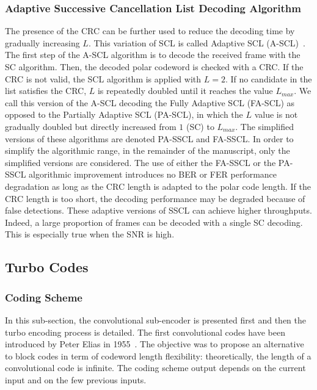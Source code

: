 \subsubsection{Adaptive Successive Cancellation List Decoding Algorithm}
\label{sec:ctx_polar_ascl}

The presence of the CRC can be further used to reduce the decoding time by
gradually increasing $L$. This variation of SCL is called Adaptive SCL
(A-SCL)~\cite{Li2012}. The first step of the A-SCL algorithm is to decode the
received frame with the SC algorithm. Then, the decoded polar codeword is
checked with a CRC. If the CRC is not valid, the SCL algorithm is applied with
$L=2$. If no candidate in the list satisfies the CRC, $L$ is repeatedly doubled
until it reaches the value $L_{max}$. We call this version of the A-SCL decoding
the Fully Adaptive SCL (FA-SCL) as opposed to the Partially Adaptive SCL
(PA-SCL), in which the $L$ value is not gradually doubled but directly increased
from $1$ (SC) to $L_{max}$. The simplified versions of these algorithms are
denoted PA-SSCL and FA-SSCL. In order to simplify the algorithmic range, in the
remainder of the manuscript, only the simplified versions are considered. The
use of either the FA-SSCL or the PA-SSCL algorithmic improvement introduces no
BER or FER performance degradation as long as the CRC length is adapted to the
polar code length. If the CRC length is too short, the decoding performance may
be degraded because of false detections. These adaptive versions of SSCL can
achieve higher throughputs. Indeed, a large proportion of frames can be decoded
with a single SC decoding. This is especially true when the SNR is high.

\subsection{Turbo Codes}
\label{sec:ctx_turbo}

\subsubsection{Coding Scheme}

In this sub-section, the convolutional sub-encoder is presented first and then
the turbo encoding process is detailed. The first convolutional codes have been
introduced by Peter Elias in 1955~\cite{Elias1955}. The objective was to propose
an alternative to block codes in term of codeword length flexibility:
theoretically, the length of a convolutional code is infinite. The coding scheme
output depends on the current input and on the few previous inputs.

